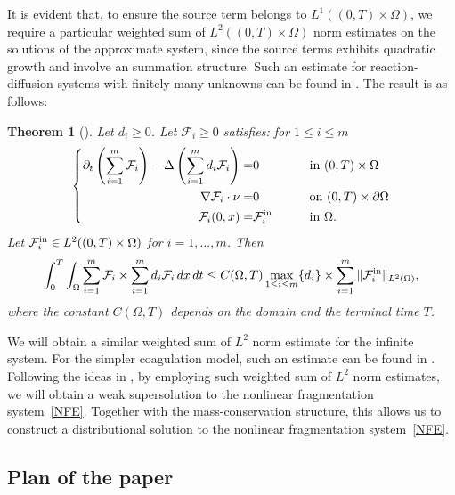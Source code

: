 \documentclass[a4paper,12pt,reqno]{amsart}
\theoremstyle{plain}
\newtheorem{thm}{Theorem}[section]
\numberwithin{equation}{section}
\begin{document}
	It is evident that, to ensure the source term belongs to $L^1((0,T)\times\Omega)$, we require a particular weighted sum of $L^2((0,T)\times\Omega)$ norm estimates on the solutions of the approximate system, since the source terms exhibits quadratic growth and involve an summation structure. Such an estimate for reaction-diffusion systems with finitely many unknowns can be found in \cite{desvillettes2007global}. The result is as follows:
	\begin{thm}[\cite{desvillettes2007global}]\label{finite L^2 estimate}
		Let $d_i\geq 0$. Let $\mathcal{F}_i\geq 0$ satisfies: for $1\leq i\leq m$
		\begin{equation*}
			\left \{
			\begin{aligned}
				\partial_t \left( \sum_{i=1}^m \mathcal{F}_i\right)- \Delta \left( \sum_{i=1}^m d_i\mathcal{F}_i\right)=&0 \qquad && \mbox{in}\ (0,T)\times\Omega\\
				\nabla \mathcal{F}_i\cdot \nu=& 0 \qquad && \mbox{on} \ (0,T)\times\partial\Omega\\
				\mathcal{F}_i(0,x)=& \mathcal{F}_{i}^{\rm{in}} \qquad && \mbox{in}\ \Omega.
			\end{aligned}
			\right .
		\end{equation*}
		Let $\mathcal{F}_i^{\rm in} \in L^2((0,T)\times\Omega)$ for $i = 1, \dots, m$.
		Then
		\[
		\int_{0}^T \int_{\Omega} \sum\limits_{i=1}^m \mathcal{F}_i \times \sum\limits_{i=1}^m d_i\mathcal{F}_i \, dx \, dt \leq C(\Omega,T) \max\limits_{1\leq i\leq m}\{d_i\} \times \sum_{i=1}^m \| \mathcal{F}_i^{\rm{in}}\|_{L^2(\Omega)},
		\]
		where the constant $C(\Omega,T)$ depends on the domain and the terminal time $T$.
	\end{thm}
	We will obtain a similar weighted sum of $L^2$ norm estimate for the infinite system. 
	For the simpler coagulation model, such an estimate can be found in \cite{canizo2010absence}. Following the ideas in \cite{Pierre2010}, by employing such weighted sum of $L^2$ norm estimates, we will obtain a weak supersolution to the nonlinear fragmentation system~\eqref{NFE}. Together with the mass-conservation structure, this allows us to construct a distributional solution to the nonlinear fragmentation system~\eqref{NFE}.
	
	
	
	\subsection{Plan of the paper}
	
\end{document}

